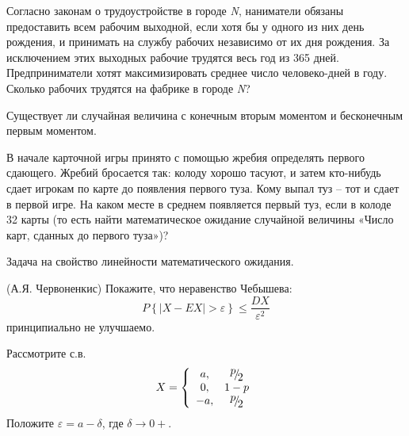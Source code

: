 \begin{problem}
Согласно законам о трудоустройстве в городе \textit{N}, наниматели обязаны предоставить всем рабочим выходной, если хотя бы у одного из них день рождения, и принимать на службу рабочих независимо от их дня рождения. За исключением этих выходных рабочие трудятся весь год из 365 дней. Предприниматели хотят максимизировать среднее число человеко-дней в году. Сколько рабочих трудятся на фабрике в городе \textit{N}?

\end{problem}

\begin{problem}
Существует ли случайная величина с конечным вторым моментом и бесконечным первым моментом.
\end{problem}

\begin{problem}
В начале карточной игры принято с помощью жребия определять первого сдающего. Жребий бросается так: колоду хорошо тасуют, и затем кто-нибудь сдает игрокам по карте до появления первого туза. Кому выпал туз -- тот и сдает в первой игре. На каком месте в среднем появляется первый туз, если в колоде 32 карты (то есть найти математическое ожидание случайной величины «Число карт, сданных до первого туза»)?

\begin{ordre} 
Задача на свойство линейности математического ожидания.
\end{ordre}

\end{problem}

\begin{problem}
(А.Я. Червоненкис) Покажите, что неравенство Чебышева:
\[P\left\{\left|X-EX\right|>\varepsilon \right\}\le \frac{DX}{\varepsilon ^{2} } \] 
принципиально не улучшаемо.

\begin{ordre} 
Рассмотрите с.в. 
\[X=\left\{\begin{array}{cc} {a,} & {{\raise0.7ex\hbox{$ p $}\!\mathord{\left/ {\vphantom {p 2}} \right. \kern-\nulldelimiterspace}\!\lower0.7ex\hbox{$ 2 $}} } \\ {0,} & {1-p} \\ {-a,} & {{\raise0.7ex\hbox{$ p $}\!\mathord{\left/ {\vphantom {p 2}} \right. \kern-\nulldelimiterspace}\!\lower0.7ex\hbox{$ 2 $}} } \end{array}\right. \] 
Положите $\varepsilon =a-\delta $, где $\delta \to 0+$.
\end{ordre}

\end{problem}


